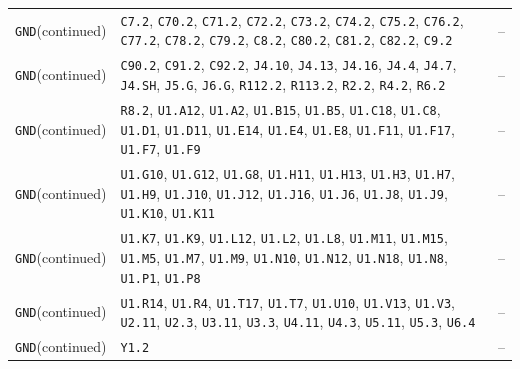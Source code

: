 \documentclass[11pt,a4paper]{article}
\begin{document}
\begin{longtable}{@{}P{48mm}P{109mm}P{10mm}@{}}
\nolinkurl{GND}\newline (continued) & \nolinkurl{C7.2}, \nolinkurl{C70.2}, \nolinkurl{C71.2}, \nolinkurl{C72.2}, \nolinkurl{C73.2}, \nolinkurl{C74.2}, \nolinkurl{C75.2}, \nolinkurl{C76.2}, \nolinkurl{C77.2}, \nolinkurl{C78.2}, \nolinkurl{C79.2}, \nolinkurl{C8.2}, \nolinkurl{C80.2}, \nolinkurl{C81.2}, \nolinkurl{C82.2}, \nolinkurl{C9.2} & -- \\
\nolinkurl{GND}\newline (continued) & \nolinkurl{C90.2}, \nolinkurl{C91.2}, \nolinkurl{C92.2}, \nolinkurl{J4.10}, \nolinkurl{J4.13}, \nolinkurl{J4.16}, \nolinkurl{J4.4}, \nolinkurl{J4.7}, \nolinkurl{J4.SH}, \nolinkurl{J5.G}, \nolinkurl{J6.G}, \nolinkurl{R112.2}, \nolinkurl{R113.2}, \nolinkurl{R2.2}, \nolinkurl{R4.2}, \nolinkurl{R6.2} & -- \\
\nolinkurl{GND}\newline (continued) & \nolinkurl{R8.2}, \nolinkurl{U1.A12}, \nolinkurl{U1.A2}, \nolinkurl{U1.B15}, \nolinkurl{U1.B5}, \nolinkurl{U1.C18}, \nolinkurl{U1.C8}, \nolinkurl{U1.D1}, \nolinkurl{U1.D11}, \nolinkurl{U1.E14}, \nolinkurl{U1.E4}, \nolinkurl{U1.E8}, \nolinkurl{U1.F11}, \nolinkurl{U1.F17}, \nolinkurl{U1.F7}, \nolinkurl{U1.F9} & -- \\
\nolinkurl{GND}\newline (continued) & \nolinkurl{U1.G10}, \nolinkurl{U1.G12}, \nolinkurl{U1.G8}, \nolinkurl{U1.H11}, \nolinkurl{U1.H13}, \nolinkurl{U1.H3}, \nolinkurl{U1.H7}, \nolinkurl{U1.H9}, \nolinkurl{U1.J10}, \nolinkurl{U1.J12}, \nolinkurl{U1.J16}, \nolinkurl{U1.J6}, \nolinkurl{U1.J8}, \nolinkurl{U1.J9}, \nolinkurl{U1.K10}, \nolinkurl{U1.K11} & -- \\
\nolinkurl{GND}\newline (continued) & \nolinkurl{U1.K7}, \nolinkurl{U1.K9}, \nolinkurl{U1.L12}, \nolinkurl{U1.L2}, \nolinkurl{U1.L8}, \nolinkurl{U1.M11}, \nolinkurl{U1.M15}, \nolinkurl{U1.M5}, \nolinkurl{U1.M7}, \nolinkurl{U1.M9}, \nolinkurl{U1.N10}, \nolinkurl{U1.N12}, \nolinkurl{U1.N18}, \nolinkurl{U1.N8}, \nolinkurl{U1.P1}, \nolinkurl{U1.P8} & -- \\
\nolinkurl{GND}\newline (continued) & \nolinkurl{U1.R14}, \nolinkurl{U1.R4}, \nolinkurl{U1.T17}, \nolinkurl{U1.T7}, \nolinkurl{U1.U10}, \nolinkurl{U1.V13}, \nolinkurl{U1.V3}, \nolinkurl{U2.11}, \nolinkurl{U2.3}, \nolinkurl{U3.11}, \nolinkurl{U3.3}, \nolinkurl{U4.11}, \nolinkurl{U4.3}, \nolinkurl{U5.11}, \nolinkurl{U5.3}, \nolinkurl{U6.4} & -- \\
\nolinkurl{GND}\newline (continued) & \nolinkurl{Y1.2} & -- \\

\end{longtable}
\end{document}

